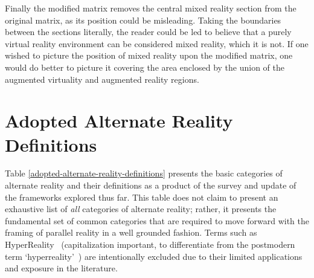 Finally the modified matrix removes the central mixed reality section from the original matrix, as its position could be misleading. Taking the boundaries between the sections literally, the reader could be led to believe that a purely virtual reality environment can be considered mixed reality, which it is not. If one wished to picture the position of mixed reality upon the modified matrix, one would do better to picture it covering the area enclosed by the union of the augmented virtuality and augmented reality regions.


\section{Adopted Alternate Reality Definitions}
\label{summaryofalternaterealitydefinitions}

Table \ref{adopted-alternate-reality-definitions} presents the basic categories of alternate reality and their definitions as a product of the survey and update of the frameworks explored thus far. This table does not claim to present an exhaustive list of \textit{all} categories of alternate reality; rather, it presents the fundamental set of common categories that are required to move forward with the framing of parallel reality in a well grounded fashion. Terms such as HyperReality~\cite{Terashima2001} (capitalization important, to differentiate from the postmodern term `hyperreality'~\cite{Baudrillard1994}) are intentionally excluded due to their limited applications and exposure in the literature.



